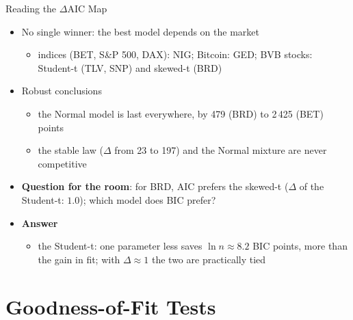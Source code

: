 \begin{frame}{Reading the $\Delta$AIC Map}
\itemsize{\small}
\begin{itemize}
    \item No single winner: the best model depends on the market
    \begin{itemize}
        \item indices (BET, S\&P 500, DAX): NIG; Bitcoin: GED; BVB stocks: Student-t (TLV, SNP) and skewed-t (BRD)
    \end{itemize}
    \item Robust conclusions
    \begin{itemize}
        \item the Normal model is last everywhere, by 479 (BRD) to 2\,425 (BET) points
        \item the stable law ($\Delta$ from 23 to 197) and the Normal mixture are never competitive
    \end{itemize}
    \item \textbf{Question for the room}: for BRD, AIC prefers the skewed-t ($\Delta$ of the Student-t: $1.0$); which model does BIC prefer?
    \item \textbf{Answer}
    \begin{itemize}
        \item the Student-t: one parameter less saves $\ln n \approx 8.2$ BIC points, more than the gain in fit; with $\Delta \approx 1$ the two are practically tied
    \end{itemize}
\end{itemize}
\end{frame}


\section{Goodness-of-Fit Tests}

